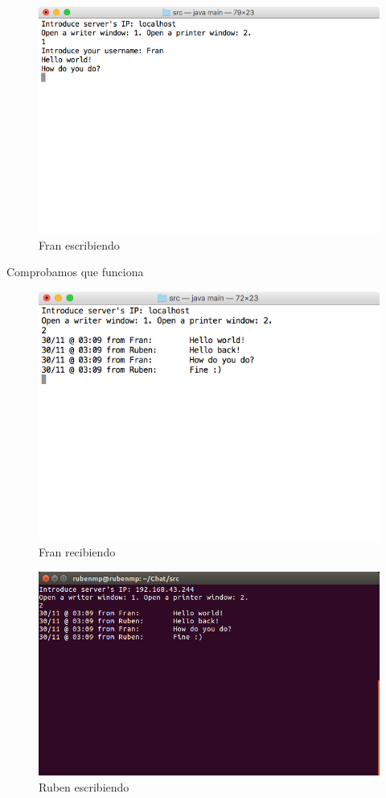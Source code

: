 \begin{figure}[H]
	\includegraphics[scale=0.55]{./Imagenes/franwriter2.png}
	\caption{Fran escribiendo}
\end{figure}

Comprobamos que funciona

\begin{figure}[H]
	\includegraphics[scale=0.55]{./Imagenes/franprinter2.png}
	\caption{Fran recibiendo}
\end{figure}

\vspace{0.1cm}

\begin{figure}[H]
	\includegraphics[scale=0.55]{./Imagenes/rubenprinter2.png}
	\caption{Ruben escribiendo}
\end{figure}



